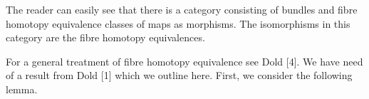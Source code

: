 The reader can easily see that there is a category consisting of bundles and fibre homotopy equivalence classes of maps as morphisms. The isomorphisms in this category are the fibre homotopy equivalences.

For a general treatment of fibre homotopy equivalence see Dold [4]. We have need of a result from Dold [1] which we outline here. First, we consider the following lemma.
